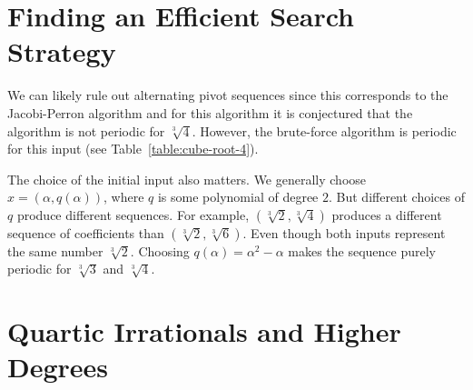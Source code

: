 \section{Finding an Efficient Search Strategy}

We can likely rule out alternating pivot sequences since this corresponds to
the Jacobi-Perron algorithm and for this algorithm it is conjectured
\cite{Karpenkov2024} that the algorithm is not periodic for $\sqrt[3]{4}$.
However, the brute-force algorithm is periodic for this input (see Table~\ref{table:cube-root-4}).

The choice of the initial input also matters.
We generally choose $x = (α, q(α))$, where $q$ is some polynomial of degree $2$.
But different choices of $q$ produce different sequences.
For example, $(\sqrt[3]{2}, \sqrt[3]{4})$ produces a different sequence of coefficients than $(\sqrt[3]{2}, \sqrt[3]{6})$.
Even though both inputs represent the same number $\sqrt[3]{2}$.
Choosing $q(α) = α^2 - α$ makes the sequence purely periodic for $\sqrt[3]{3}$ and $\sqrt[3]{4}$.

\section{Quartic Irrationals and Higher Degrees}
